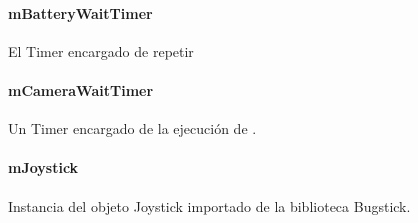 \paragraph{mBatteryWaitTimer}
\label{\detokenize{dev_docs:mbatterywaittimer}}

\begin{fulllineitems}
\label{\detokenize{dev_docs:com.lar.cloudnao.RemoteControllerActivity.mBatteryWaitTimer}}
El Timer encargado de repetir {\hyperref[\detokenize{dev_docs:com.lar.cloudnao.RemoteControllerActivity.mTimerBatteryStatusTask}]{}}

\end{fulllineitems}



\paragraph{mCameraWaitTimer}
\label{\detokenize{dev_docs:mcamerawaittimer}}

\begin{fulllineitems}
\label{\detokenize{dev_docs:com.lar.cloudnao.RemoteControllerActivity.mCameraWaitTimer}}
Un Timer encargado de la ejecución de {\hyperref[\detokenize{dev_docs:com.lar.cloudnao.RemoteControllerActivity.mTimerTaskCamera}]{}}.

\end{fulllineitems}



\paragraph{mJoystick}
\label{\detokenize{dev_docs:mjoystick}}

\begin{fulllineitems}
\label{\detokenize{dev_docs:com.lar.cloudnao.RemoteControllerActivity.mJoystick}}
Instancia del objeto Joystick importado de la biblioteca Bugstick.

\end{fulllineitems}



